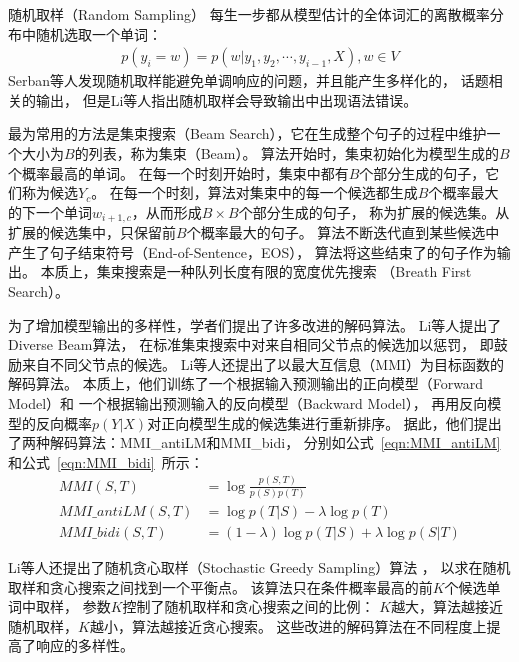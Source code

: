 随机取样（Random Sampling）
每生一步都从模型估计的全体词汇的离散概率分布中随机选取一个单词：
\begin{align}
    p(y_i = w) = p(w|y_1, y_2, \cdots, y_{i-1}, X), w \in V
\end{align}
Serban等人发现随机取样能避免单调响应的问题，并且能产生多样化的，
话题相关的输出，
但是Li等人指出随机取样会导致输出中出现语法错误。

最为常用的方法是集束搜索（Beam Search），它在生成整个句子的过程中维护一个大小为$B$的列表，称为集束（Beam）。
算法开始时，集束初始化为模型生成的$B$个概率最高的单词。
在每一个时刻开始时，集束中都有$B$个部分生成的句子，它们称为候选$Y_c$。
在每一个时刻，算法对集束中的每一个候选都生成$B$个概率最大的下一个单词$w_{i+1, c}$，从而形成$B \times B$个部分生成的句子，
称为扩展的候选集。从扩展的候选集中，只保留前$B$个概率最大的句子。
算法不断迭代直到某些候选中产生了句子结束符号（End-of-Sentence，EOS），
算法将这些结束了的句子作为输出。
本质上，集束搜索是一种队列长度有限的宽度优先搜索
（Breath First Search）。

为了增加模型输出的多样性，学者们提出了许多改进的解码算法。
Li等人提出了Diverse Beam算法，
在标准集束搜索中对来自相同父节点的候选加以惩罚，
即鼓励来自不同父节点的候选。
Li等人还提出了以最大互信息（MMI）为目标函数的解码算法。
本质上，他们训练了一个根据输入预测输出的正向模型（Forward Model）和
一个根据输出预测输入的反向模型（Backward Model），
再用反向模型的反向概率$p(Y|X)$对正向模型生成的候选集进行重新排序。
据此，他们提出了两种解码算法：MMI\_antiLM和MMI\_bidi，
分别如公式~\ref{eqn:MMI_antiLM}和公式~\ref{eqn:MMI_bidi}~所示：
\begin{align}
    MMI(S, T) &= \log \frac{p(S, T)}{p(S)p(T)} \label{eqn:MMI} \\
    \textit{MMI\_antiLM}(S, T) &= \log p(T|S) - \lambda \log p(T) \label{eqn:MMI_antiLM} \\
    \textit{MMI\_bidi}(S, T) &= (1 - \lambda) \log p(T|S) + \lambda \log p(S|T) \label{eqn:MMI_bidi}
\end{align}

Li等人还提出了随机贪心取样（Stochastic Greedy Sampling）算法
，
以求在随机取样和贪心搜索之间找到一个平衡点。
该算法只在条件概率最高的前$K$个候选单词中取样，
参数$K$控制了随机取样和贪心搜索之间的比例：
$K$越大，算法越接近随机取样，$K$越小，算法越接近贪心搜索。
这些改进的解码算法在不同程度上提高了响应的多样性。

